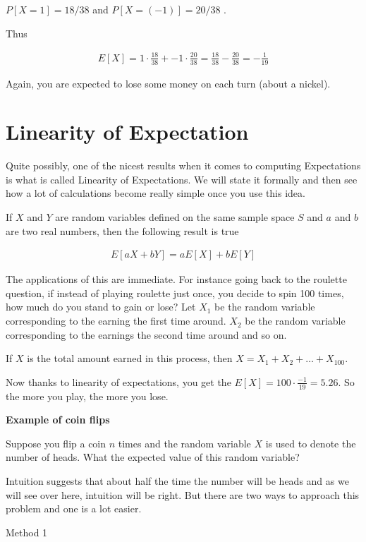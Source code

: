 \documentclass[12pt]{article}
\begin{document}
$P[X = 1] = 18/38$ and  $P[X = (-1)] = 20/38$ . 

Thus

\begin{align*}
E[X] = 1 \cdot \frac{18}{38} + -1 \cdot \frac{20}{38} = \frac{18}{38} - \frac{20}{38} = -\frac{1}{19}
\end{align*}

Again, you are expected to lose some money on each turn (about a nickel).

\section*{Linearity of Expectation}
Quite possibly, one of the nicest results when it comes to computing Expectations is what is called Linearity of Expectations. We will state it formally and then see how a lot of calculations become really simple once you use this idea.

If $X$ and $Y$ are random variables defined on the same sample space $S$ and $a$ and $b$ are two real numbers, then the following result is true

\begin{align*}
E[aX + bY] = a E[X] + bE[Y]
\end{align*}

The applications of this are immediate. For instance going back to the roulette question, if instead of playing roulette just once, you decide to spin 100 times, how much do you stand to gain or lose?
Let $X_1$ be the random variable corresponding to the earning the first time around. $X_2$ be the random variable corresponding to the earnings the second time around and so on. 

If $X$ is the total amount earned in this process, then $X = X_1 + X_2 + \ldots + X_{100}$. 

Now thanks to linearity of expectations, you get the $E[X] = 100 \cdot \frac{-1}{19} = 5.26$. So the more you play, the more you lose. 

\textbf{Example of coin flips}

Suppose you flip a coin $n$ times and the random variable $X$ is used to denote the number of heads. What the expected value of this random variable?

Intuition suggests that about half the time the number will be heads and as we will see over here, intuition will be right. But there are two ways to approach this problem and one is a lot easier.

Method 1
\end{document}
